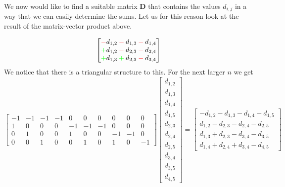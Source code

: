 \documentclass{article}
\begin{document}
\pagebreak 

\noindent We now would like to find a suitable matrix $\mathbf{D}$ that contains the values $d_{i,j}$ in a way that we can easily determine the sums. Let us for this reason look at the result of the matrix-vector product above.

\begin{equation*}
    \begin{bmatrix}
        \color{red}-\color{black}d_{1,2} \color{red}-\color{black}d_{1,3} \color{red}-\color{black}d_{1,4} \\
        \color{green}+\color{black}d_{1,2} \color{red}-\color{black}d_{2,3} \color{red}-\color{black} d_{2,4} \\
        \color{green}+\color{black}d_{1,3} \color{green}+\color{black}d_{2,3} \color{red}-\color{black}d_{3,4}
    \end{bmatrix}
\end{equation*}
We notice that there is a triangular structure to this. For the next larger $n$ we get
\begin{equation*}
    \begin{bmatrix}
        -1 & -1 & -1 & -1 & 0 & 0 & 0 & 0 & 0 & 0\\
        1 & 0 & 0 & 0 & -1 & -1 & -1 & 0 & 0 & 0\\
        0 & 1 & 0 & 0 & 1 & 0 & 0 & -1 & -1 & 0\\
        0 & 0 & 1 & 0 & 0 & 1 & 0 & 1 & 0 & -1
    \end{bmatrix}\begin{bmatrix}
        d_{1,2} \\
        d_{1,3} \\
        d_{1,4} \\
        d_{1,5} \\
        d_{2,3} \\
        d_{2,4} \\
        d_{2,5} \\
        d_{3,4} \\
        d_{3,5} \\
        d_{4,5}
    \end{bmatrix} = \begin{bmatrix}
        -d_{1,2} -d_{1,3} - d_{1,4} -d_{1,5}\\
        d_{1,2} -d_{2,3} - d_{2,4} - d_{2,5}\\
        d_{1,3} +d_{2,3} -d_{3,4} - d_{3,5} \\
        d_{1,4} + d_{2,4} + d_{3,4} - d_{4,5}
    \end{bmatrix}
\end{equation*}
\end{document}
